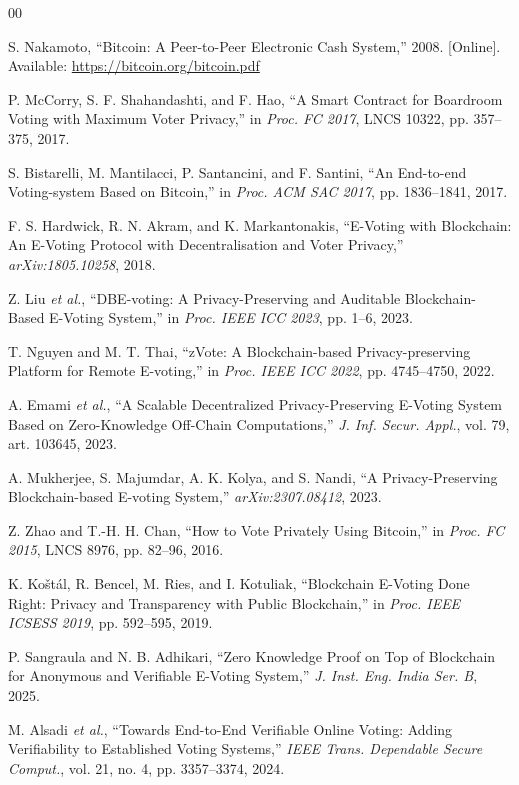 \documentclass{ieeeaccess}
\begin{document}
\begin{thebibliography}{00}

S. Nakamoto, ``Bitcoin: A Peer-to-Peer Electronic Cash System,'' 2008. [Online]. Available: \url{https://bitcoin.org/bitcoin.pdf}

P. McCorry, S. F. Shahandashti, and F. Hao, ``A Smart Contract for Boardroom Voting with Maximum Voter Privacy,'' in \emph{Proc. FC 2017}, LNCS 10322, pp. 357--375, 2017.

S. Bistarelli, M. Mantilacci, P. Santancini, and F. Santini, ``An End-to-end Voting-system Based on Bitcoin,'' in \emph{Proc. ACM SAC 2017}, pp. 1836--1841, 2017.

F. S. Hardwick, R. N. Akram, and K. Markantonakis, ``E-Voting with Blockchain: An E-Voting Protocol with Decentralisation and Voter Privacy,'' \emph{arXiv:1805.10258}, 2018.

Z. Liu \emph{et al.}, ``DBE-voting: A Privacy-Preserving and Auditable Blockchain-Based E-Voting System,'' in \emph{Proc. IEEE ICC 2023}, pp. 1--6, 2023.

T. Nguyen and M. T. Thai, ``zVote: A Blockchain-based Privacy-preserving Platform for Remote E-voting,'' in \emph{Proc. IEEE ICC 2022}, pp. 4745--4750, 2022.

A. Emami \emph{et al.}, ``A Scalable Decentralized Privacy-Preserving E-Voting System Based on Zero-Knowledge Off-Chain Computations,'' \emph{J. Inf. Secur. Appl.}, vol. 79, art. 103645, 2023.

A. Mukherjee, S. Majumdar, A. K. Kolya, and S. Nandi, ``A Privacy-Preserving Blockchain-based E-voting System,'' \emph{arXiv:2307.08412}, 2023.

Z. Zhao and T.-H. H. Chan, ``How to Vote Privately Using Bitcoin,'' in \emph{Proc. FC 2015}, LNCS 8976, pp. 82--96, 2016.

K. Ko{\v s}t{\'a}l, R. Bencel, M. Ries, and I. Kotuliak, ``Blockchain E-Voting Done Right: Privacy and Transparency with Public Blockchain,'' in \emph{Proc. IEEE ICSESS 2019}, pp. 592--595, 2019.

P. Sangraula and N. B. Adhikari, ``Zero Knowledge Proof on Top of Blockchain for Anonymous and Verifiable E-Voting System,'' \emph{J. Inst. Eng. India Ser. B}, 2025.

M. Alsadi \emph{et al.}, ``Towards End-to-End Verifiable Online Voting: Adding Verifiability to Established Voting Systems,'' \emph{IEEE Trans. Dependable Secure Comput.}, vol. 21, no. 4, pp. 3357--3374, 2024.


\end{thebibliography}
\end{document}
